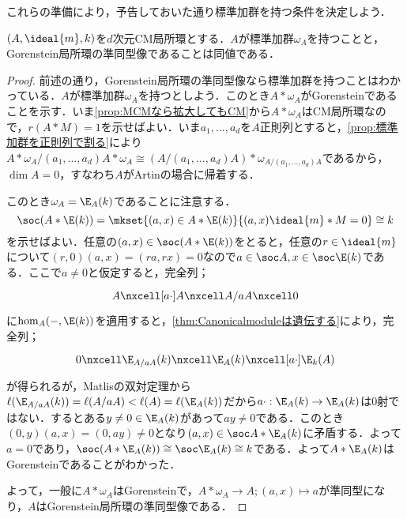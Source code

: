これらの準備により，予告しておいた通り標準加群を持つ条件を決定しよう．

\begin{thm}\label{thm:Canonicalmodの存在条件}
	$(A,\ideal{m},k)$を$d$次元CM局所環とする．$A$が標準加群$\omega_A$を持つことと，Gorenstein局所環の準同型像であることは同値である．
\end{thm}

\begin{proof}
	前述の通り，Gorenstein局所環の準同型像なら標準加群を持つことはわかっている．$A$が標準加群$\omega_A$を持つとしよう．このとき$A*\omega_A$がGorensteinであることを示す．いま\ref{prop:MCMなら拡大してもCM}から$A*\omega_A$はCM局所環なので，$r(A*M)=1$を示せばよい．いま$a_1,\dots,a_d$を$A$正則列とすると，\ref{prop:標準加群を正則列で割る}により$A*\omega_A/(a_1,\dots,a_d)A*\omega_A\cong(A/(a_1,\dots,a_d)A)*\omega_{A/(a_1,\dots,a_d)A}$であるから，$\dim A=0$，すなわち$A$がArtinの場合に帰着する．
	
	このとき$\omega_A=\E_A(k)$であることに注意する．
	\[\soc (A*\E(k))=\mkset{(a,x)\in A*\E(k)}{(a,x)\ideal{m}*M=0}\cong k\]
	を示せばよい．任意の$(a,x)\in\soc (A*\E(k))$をとると，任意の$r\in\ideal{m}$について$(r,0)(a,x)=(ra,rx)=0$なので$a\in\soc A,x\in\soc\E(k)$である．ここで$a\neq0$と仮定すると，完全列；
	\[\begin{tikzcd}
		A\nxcell[a\cdot]A\nxcell A/aA\nxcell0
	\end{tikzcd}\]
	に$\hom_A(-,\E(k))$を適用すると，\ref{thm:Canonicalmoduleは遺伝する}により，完全列；
	\[\begin{tikzcd}
		0\nxcell\E_{A/aA}(k)\nxcell\E_A(k)\nxcell[a\cdot]\E_k(A)
	\end{tikzcd}\]
	が得られるが，Matlisの双対定理から$\ell(\E_{A/aA}(k))=\ell(A/aA)<\ell(A)=\ell(\E_A(k))$だから$a\cdot:\E_A(k)\to\E_A(k)$は$0$射ではない．するとある$y\neq 0\in\E_A(k)$があって$ay\neq 0$である．このとき$(0,y)(a,x)=(0,ay)\neq0$となり$(a,x)\in\soc A*\E_A(k)$に矛盾する．よって$a=0$であり，$\soc (A*\E_A(k))\cong\soc\E_A(k)\cong k$である．よって$A*\E_A(k)$はGorensteinであることがわかった．
	
	よって，一般に$A*\omega_A$はGorensteinで，$A*\omega_A\to A;(a,x)\mapsto a$が準同型になり，$A$はGorenstein局所環の準同型像である． 
\end{proof}